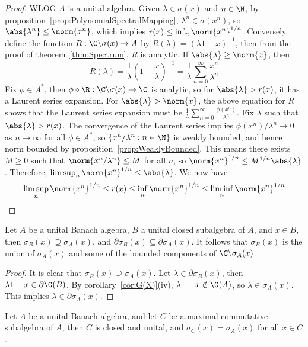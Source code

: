 \documentclass[a4paper]{article}
\begin{document}
\begin{proof}
	WLOG $A$ is a unital algebra. Given $\lambda\in\sigma(x)$ and $n\in\N$, by proposition~\ref{prop:PolynomialSpectralMapping}, $\lambda^n\in\sigma(x^n)$, so $\abs{\lambda^n}\leq\norm{x^n}$, which implies $r(x)\leq\inf_n\norm{x^n}^{1/n}$. Conversely, define the function $R:\C\backslash\sigma(x)\to A$ by $R(\lambda)=(\lambda 1-x)^{-1}$, then from the proof of theorem~\ref{thm:Spectrum}, $R$ is analytic. If $\abs{\lambda}\geq\norm{x}$, then
	\[
	 R(\lambda)=\frac{1}{\lambda}\left(1-\frac{x}{\lambda}\right)^{-1}=\frac{1}{\lambda}\sum_{n=0}^\infty\frac{x^n}{\lambda^n}
	\]
	Fix $\phi\in A^*$, then $\phi\circ\R:\C\backslash\sigma(x)\to\C$ is analytic, so for $\abs{\lambda}>r(x)$, it has a Laurent series expansion. For $\abs{\lambda}>\norm{x}$, the above equation for $R$ shows that the Laurent series expansion must be $\frac{1}{\lambda}\sum_{n=0}^\infty\frac{\phi(x^n)}{\lambda^n}$. Fix $\lambda$ such that $\abs{\lambda}>r(x)$. The convergence of the Laurent series implies $\phi(x^n)/\lambda^n\to 0$ as $n\to\infty$ for all $\phi\in A^*$, so $\{x^n/\lambda^n:n\in\N\}$ is weakly bounded, and hence norm bounded by proposition~\ref{prop:WeaklyBounded}. This means there exists $M\geq 0$ such that $\norm{x^n/\lambda^n}\leq M$ for all $n$, so $\norm{x^n}^{1/n}\leq M^{1/n}\abs{\lambda}$. Therefore, $\limsup_n\norm{x^n}^{1/n}\leq\abs{\lambda}$. We now have
	\[
	 \limsup_n\norm{x^n}^{1/n}\leq r(x)\leq\inf_n\norm{x^n}^{1/n}\leq\liminf_n\norm{x^n}^{1/n}\qedhere
	\]
\end{proof}

\begin{nthm}\label{thm:SpecExtension}
  Let $A$ be a unital Banach algebra, $B$ a unital closed subalgebra of $A$, and $x\in B$, then $\sigma_B(x)\supseteq\sigma_A(x)$, and $\partial\sigma_B(x)\subseteq\partial\sigma_A(x)$. It follows that $\sigma_B(x)$ is the union of $\sigma_A(x)$ and some of the bounded components of $\C\backslash\sigma_A(x)$.
\end{nthm}

\begin{proof}
  It is clear that $\sigma_B(x)\supseteq\sigma_A(x)$. Let $\lambda\in\partial\sigma_B(x)$, then $\lambda 1-x\in\partial\G(B)$. By corollary~\ref{cor:G(X)}(iv), $\lambda 1-x\notin\G(A)$, so $\lambda\in\sigma_A(x)$. This implies $\lambda\in\partial\sigma_A(x)$.
\end{proof}

\begin{nprop}\label{prop:CommSubAlg}
  Let $A$ be a unital Banach algebra, and let $C$ be a maximal commutative subalgebra of $A$, then $C$ is closed and unital, and $\sigma_C(x)=\sigma_A(x)$ for all $x\in C$.
\end{nprop}
\end{document}
